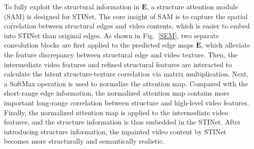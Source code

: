 To fully exploit the structural information in $\boldsymbol{E}$, a structure attention module (SAM) is designed for STINet.
The core insight of SAM is to capture the spatial correlation between structural edges and video contents, which is easier to embed into STINet than original edges.
As shown in Fig.~\ref{SEM}, two separate convolution blocks are first applied to the predicted edge maps $\boldsymbol{E}$, which alleviate the feature discrepancy between structural edge and video texture.
Then, the intermediate video features and refined structural features are interacted to calculate the latent structure-texture correlation via matrix multiplication. 
%
Next, a SoftMax operation is used to normalize the attention map.
%
Compared with the short-range edge information, the normalized attention map contains more important long-range correlation between structure and high-level video features.
Finally, the normalized attention map is applied to the intermediate video features, and the structure information is thus embedded in the STINet.
After introducing structure information, the inpainted video content by STINet becomes more structurally and semantically realistic.



